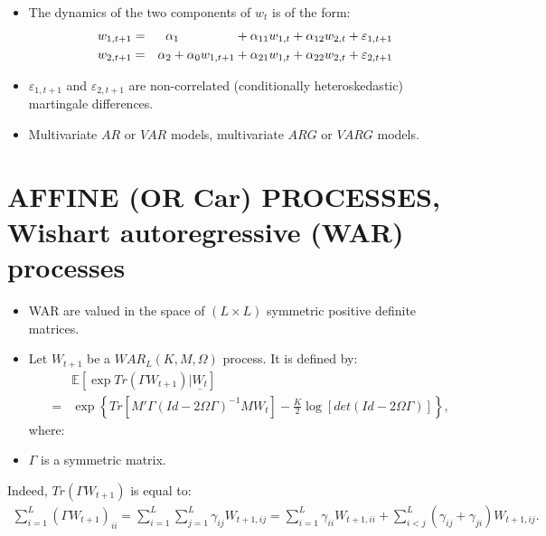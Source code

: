 \documentclass[
  12pt,
]{book}
\providecommand{\tightlist}{%
  \setlength{\itemsep}{0pt}\setlength{\parskip}{0pt}}
\theoremstyle{definition}
\theoremstyle{definition}
\theoremstyle{definition}
\theoremstyle{definition}
\theoremstyle{remark}
\begin{document}
\begin{itemize}
\tightlist
\item
  The dynamics of the two components of \(w_t\) is of the form:
  \begin{eqnarray*}
  w_{1,t+1} &=& \alpha_1 \hspace{1.55cm} + \alpha_{11}w_{1,t} + \alpha_{12}w_{2,t} + \varepsilon_{1,t+1} \\
  w_{2,t+1} &=& \alpha_2 + \alpha_{0}w_{1,t+1} + \alpha_{21}w_{1,t} + \alpha _{22} w_{2,t} + \varepsilon_{2,t+1}
  \end{eqnarray*}
\item
  \(\varepsilon_{1,t+1}\) and \(\varepsilon_{2,t+1}\) are non-correlated (conditionally heteroskedastic) martingale differences.
\item
  Multivariate \(AR\) or \(VAR\) models, multivariate \(ARG\) or
  \(VARG\) models.
\end{itemize}

\hypertarget{WAR}{%
\section{AFFINE (OR Car) PROCESSES, Wishart autoregressive (WAR) processes}\label{WAR}}

\begin{itemize}
\tightlist
\item
  WAR are valued in the space of \((L \times L)\) symmetric positive
  definite matrices.
\item
  Let \(W_{t+1}\) be a \(WAR_L(K, M, \Omega)\) process. It is defined by:
  \begin{eqnarray}
  &&\mathbb{E}[\exp   Tr(\Gamma W_{t+1})|\underline{W_t}] \label{eq:Trace}\\
  &=& \exp\left\{Tr[M'\Gamma(Id-2\Omega \Gamma)^{-1}M W_t]  -  \frac{K}{2}   \log [det(Id-2\Omega \Gamma)]\right\}, \nonumber
  \end{eqnarray}
  where:
\item
  \(\Gamma\) is a symmetric matrix.
\end{itemize}

Indeed, \(Tr(\Gamma W_{t+1})\) is equal to:
\begin{eqnarray*}
\sum^L_{i=1}(\Gamma W_{t+1})_{ii} = \sum^L_{i=1}  \sum^L_{j=1} \gamma_{ij} W_{t+1,ij} = \sum^L_{i=1} \gamma_{ii} W_{t+1,ii} + \sum^L_{i<j} (\gamma_{ij}+\gamma_{ji}) W_{t+1,ij}.
 \end{eqnarray*}
\end{document}
